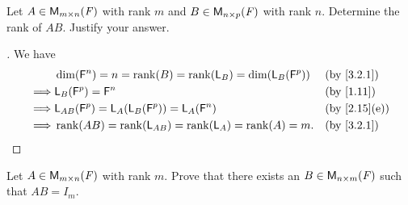 \begin{ex}\label{ex:3.2.19}
  Let \(A \in \ms\) with rank \(m\) and \(B \in \ms[n][p][\F]\) with rank \(n\).
  Determine the rank of \(AB\).
  Justify your answer.
\end{ex}

\begin{proof}[]
  We have
  \begin{align*}
             & \dim(\vs{F}^n) = n = \rk{B} = \rk{\L_B} = \dim(\L_B(\vs{F}^p)) &  & \by{3.2.1}   \\
    \implies & \L_B(\vs{F}^p) = \vs{F}^n                                      &  & \by{1.11}    \\
    \implies & \L_{AB}(\vs{F}^p) = \L_A(\L_B(\vs{F}^p)) = \L_A(\vs{F}^n)      &  & \by{2.15}[e] \\
    \implies & \rk{AB} = \rk{\L_{AB}} = \rk{\L_A} = \rk{A} = m.               &  & \by{3.2.1}
  \end{align*}
\end{proof}

\setcounter{ex}{20}
\begin{ex}\label{ex:3.2.21}
  Let \(A \in \ms\) with rank \(m\).
  Prove that there exists an \(B \in \ms[n][m][\F]\) such that \(AB = I_m\).
\end{ex}

